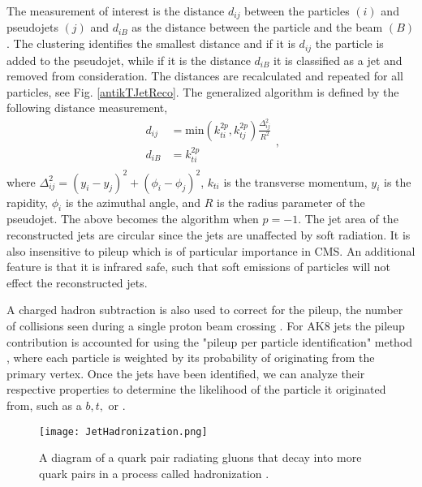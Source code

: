 The measurement of interest is the distance $d_{ij}$ between the particles $(i)$ and pseudojets $(j)$ and $d_{iB}$ as the distance between the particle and the beam $(B)$. The clustering identifies the smallest distance and if it is $d_{ij}$ the particle is added to the pseudojet, while if it is the distance $d_{iB}$ it is classified as a jet and removed from consideration. The distances are recalculated and repeated for all particles, see Fig. \ref{antikTJetReco}. The generalized algorithm is defined by the following distance measurement,
\begin{equation}\label{eqn:antikT}
\begin{split}
d_{ij}&=\text{min}(k_{ti}^{2p},k_{tj}^{2p})\frac{\Delta^2_{ij}}{R^2} \\
d_{iB}&=k_{ti}^{2p} \\
\end{split},
\end{equation}
where $\Delta^2_{ij}=(y_i-y_j)^2+(\phi_i-\phi_j)^2$, $k_{ti}$ is the transverse momentum, $y_i$ is the rapidity, $\phi_i$ is the azimuthal angle, and $R$ is the radius parameter of the pseudojet. The above becomes the \antikt{} algorithm when $p=-1$. The jet area of the reconstructed jets are circular since the \antikt{} jets are unaffected by soft radiation. It is also insensitive to pileup which is of particular importance in CMS. An additional feature is that it is infrared safe, such that soft emissions of particles will not effect the reconstructed jets. 

A charged hadron subtraction is also used to correct for the pileup, the number of collisions seen during a single proton beam crossing \cite{cacciari_pileup_2008, noauthor_pileup_2014}. For AK8 jets the pileup contribution is accounted for using the "pileup per particle identification" method \cite{bertolini_pileup_2014, noauthor_pileup_2014}, where each particle is weighted by its probability of originating from the primary vertex. Once the jets have been identified, we can analyze their respective properties to determine the likelihood of the particle it originated from, such as a $b, t,$ or \W. 

\begin{figure}
 	\centering
	\texttt{[image: JetHadronization.png]}
 	\caption[Jet Hadronization]{A diagram of a quark pair radiating gluons that decay into more quark pairs in a process called hadronization \cite{griffiths_introduction_2008}.}
 	\label{JetHadronization} 
\end{figure}


